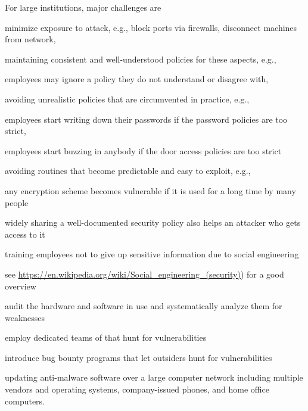 For large institutions, major challenges are
\begin{compactitem}
 \item minimize exposure to attack, e.g., block ports via firewalls, disconnect machines from network,
 \item maintaining consistent and well-understood policies for these aspects, e.g.,
  \begin{compactitem}
   \item employees may ignore a policy they do not understand or disagree with,
  \end{compactitem} 
 \item avoiding unrealistic policies that are circumvented in practice, e.g.,
  \begin{compactitem}
   \item employees start writing down their passwords if the password policies are too strict,
   \item employees start buzzing in anybody if the door access policies are too strict
  \end{compactitem}
 \item avoiding routines that become predictable and easy to exploit, e.g.,
  \begin{compactitem}
   \item any encryption scheme becomes vulnerable if it is used for a long time by many people
   \item widely sharing a well-documented security policy also helps an attacker who gets access to it
  \end{compactitem}
 \item training employees not to give up sensitive information due to social engineering
  \begin{compactitem}
   \item see \url{https://en.wikipedia.org/wiki/Social_engineering_(security)}) for a good overview
  \end{compactitem}
 \item audit the hardware and software in use and systematically analyze them for weaknesses
 \item employ dedicated teams of that hunt for vulnerabilities
 \item introduce bug bounty programs that let outsiders hunt for vulnerabilities
 \item updating anti-malware software over a large computer network including multiple vendors and operating systems, company-issued phones, and home office computers.
\end{compactitem}

